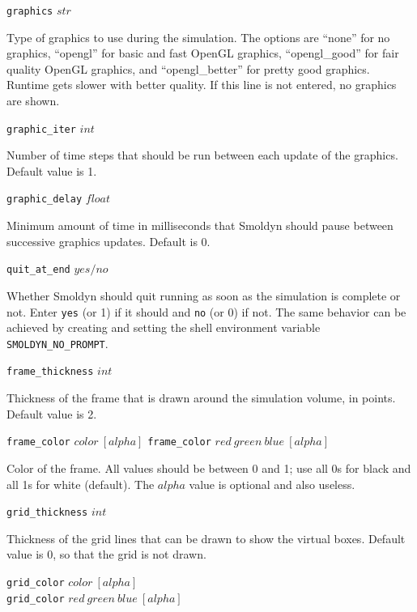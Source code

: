\documentclass {scrbook}
\newcommand {\ttt} {\texttt}
\begin{document}
\begin{description}

\item{\ttt{graphics} $str$}

Type of graphics to use during the simulation. The options are ``none'' for no graphics, ``opengl'' for basic and fast OpenGL graphics, ``opengl\_good'' for fair quality OpenGL graphics, and ``opengl\_better'' for pretty good graphics. Runtime gets slower with better quality. If this line is not entered, no graphics are shown.

\item{\ttt{graphic\_iter} $int$}

Number of time steps that should be run between each update of the graphics. Default value is 1.

\item{\ttt{graphic\_delay} $float$}

Minimum amount of time in milliseconds that Smoldyn should pause between successive graphics updates. Default is 0.

\item{\ttt{quit\_at\_end} $yes/no$}

Whether Smoldyn should quit running as soon as the simulation is complete or not. Enter \ttt{yes} (or 1) if it should and \ttt{no} (or 0) if not. The same behavior can be achieved by creating and setting the shell environment variable \ttt{SMOLDYN\_NO\_PROMPT}.

\item{\ttt{frame\_thickness} $int$}

Thickness of the frame that is drawn around the simulation volume, in points. Default value is 2.

\item{\ttt{frame\_color} $color\ [alpha]$
\ttt{frame\_color} $red\ green\ blue\ [alpha]$}

Color of the frame. All values should be between 0 and 1; use all 0s for black and all 1s for white (default). The $alpha$ value is optional and also useless.

\item{\ttt{grid\_thickness} $int$}

Thickness of the grid lines that can be drawn to show the virtual boxes. Default value is 0, so that the grid is not drawn.

\item{\ttt{grid\_color} $color\ [alpha]$\\
\ttt{grid\_color} $red\ green\ blue\ [alpha]$}


\end{description}
\end{document}
